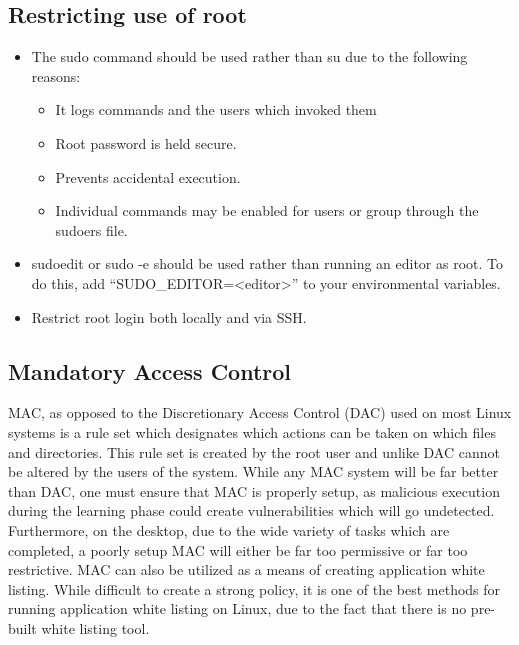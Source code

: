 			\subsection{Restricting use of root}
				\begin{itemize}
					\item The sudo command should be used rather than su due to the following reasons:
						\begin{itemize}
							\item It logs commands and the users which invoked them
							\item Root password is held secure.
							\item Prevents accidental execution.
							\item Individual commands may be enabled for users or group through the sudoers file.
						\end{itemize}
					\item sudoedit or sudo -e should be used rather than running an editor as root.
						To do this, add ``SUDO\_EDITOR=<editor>'' to your environmental variables.
					\item Restrict root login both locally and via SSH.
				\end{itemize}
			\subsection{Mandatory Access Control}
				MAC, as opposed to the Discretionary Access Control (DAC) used on most Linux systems is a rule set which designates which actions can be taken on which files and directories.
				This rule set is created by the root user and unlike DAC cannot be altered by the users of the system.
				While any MAC system will be far better than DAC, one must ensure that MAC is properly setup, as malicious execution during the learning phase could create vulnerabilities which will go undetected.
				Furthermore, on the desktop, due to the wide variety of tasks which are completed, a poorly setup MAC will either be far too permissive or far too restrictive.
				MAC can also be utilized as a means of creating application white listing.
				While difficult to create a strong policy, it is one of the best methods for running application white listing on Linux,
				due to the fact that there is no pre-built white listing tool.
